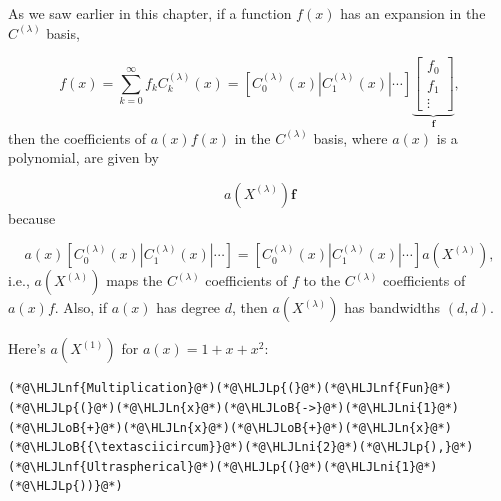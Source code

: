\documentclass[12pt,a4paper]{article}
\newcommand{\HLJLn}[1]{#1}
\newcommand{\HLJLnf}[1]{\textcolor[RGB]{66,102,213}{#1}}
\newcommand{\HLJLni}[1]{\textcolor[RGB]{59,151,46}{#1}}
\newcommand{\HLJLoB}[1]{\textcolor[RGB]{102,102,102}{\textbf{#1}}}
\newcommand{\HLJLp}[1]{#1}
\begin{document}
As we saw earlier in this chapter, if a function $f(x)$ has an expansion in the $C^{(\lambda)}$ basis,

\[
f(x) = \sum_{k=0}^{\infty}f_kC^{(\lambda)}_k(x) = \left[ C^{(\lambda)}_0(x) | C^{(\lambda)}_1(x) | \cdots  \right]\underbrace{\begin{bmatrix}
f_0 \\
f_1 \\
\vdots
\end{bmatrix}}_{\mathbf{f}},
\]
then the coefficients of $a(x)f(x)$ in the $C^{(\lambda)}$ basis, where $a(x)$ is a polynomial, are given by

\[
a(X^{(\lambda)})\mathbf{f}
\]
because

\[
a(x)\left[ C^{(\lambda)}_0(x) | C^{(\lambda)}_1(x) | \cdots  \right] = \left[ C^{(\lambda)}_0(x) | C^{(\lambda)}_1(x) | \cdots  \right]a(X^{(\lambda)}),
\]
i.e., $a(X^{(\lambda)})$ maps the $C^{(\lambda)}$ coefficients of $f$ to the $C^{(\lambda)}$ coefficients of $a(x)f$.  Also, if $a(x)$ has degree $d$, then $a(X^{(\lambda)})$ has bandwidths $(d, d)$.

Here's $a(X^{(1)})$ for $a(x) = 1 + x + x^2$:


\begin{lstlisting}
(*@\HLJLnf{Multiplication}@*)(*@\HLJLp{(}@*)(*@\HLJLnf{Fun}@*)(*@\HLJLp{(}@*)(*@\HLJLn{x}@*)(*@\HLJLoB{->}@*)(*@\HLJLni{1}@*)(*@\HLJLoB{+}@*)(*@\HLJLn{x}@*)(*@\HLJLoB{+}@*)(*@\HLJLn{x}@*)(*@\HLJLoB{{\textasciicircum}}@*)(*@\HLJLni{2}@*)(*@\HLJLp{),}@*) (*@\HLJLnf{Ultraspherical}@*)(*@\HLJLp{(}@*)(*@\HLJLni{1}@*)(*@\HLJLp{))}@*)
\end{lstlisting}
\end{document}
